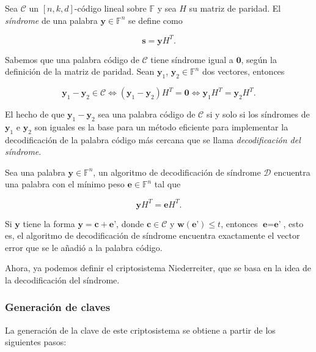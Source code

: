 \begin{definition}
    Sea $\mathcal{C}$ un $[n, k, d]$-código lineal sobre $\mathbb{F}$ y sea $H$ su matriz de paridad. El \emph{síndrome} de una palabra $\textbf{y} \in \mathbb{F}^n$ se define como

    $$\textbf{s} = \textbf{y} H^T.$$
\end{definition}

Sabemos que una palabra código de $\mathcal{C}$ tiene síndrome igual a $\textbf{0}$, según la definición de la matriz de paridad. Sean $\textbf{y}_1$, $\textbf{y}_2 \in \mathbb{F}^n$ dos vectores, entonces

$$\textbf{y}_1 - \textbf{y}_2 \in \mathcal{C} \Leftrightarrow (\textbf{y}_1 - \textbf{y}_2) H^T = \textbf{0} \Leftrightarrow \textbf{y}_1 H^T = \textbf{y}_2 H^T.$$

El hecho de que $\textbf{y}_1 - \textbf{y}_2$ sea una palabra código de $\mathcal{C}$ si y solo si los síndromes de $\textbf{y}_1$ e $\textbf{y}_2$ son iguales es la base para un método eficiente para implementar la decodificación de la palabra código más cercana que se llama \emph{decodificación del síndrome}.

Sea una palabra $\textbf{y} \in \mathbb{F}^n$, un algoritmo de decodificación de síndrome $\mathcal{D}$ encuentra una palabra con el mínimo peso $\textbf{e} \in \mathbb{F}^n$ tal que

$$\textbf{y} H^T = \textbf{e} H^T.$$

Si $\textbf{y}$ tiene la forma $\textbf{y} = \textbf{c} + \textbf{e'}$, donde $\textbf{c} \in \mathcal{C}$ y $\textbf{w}(\textbf{e'}) \leq t$, entonces $\textbf{e} = \textbf{e'}$, esto es, el algoritmo de decodificación de síndrome encuentra exactamente el vector error que se le añadió a la palabra código.

Ahora, ya podemos definir el criptosistema Niederreiter, que se basa en la idea de la decodificación del síndrome.

\subsubsection{Generación de claves}

La generación de la clave de este criptosistema se obtiene a partir de los siguientes pasos:

